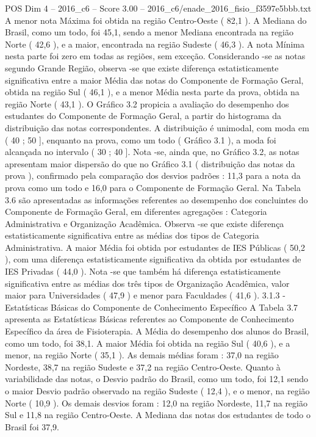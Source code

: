 \begin{textsample}{POS Dim 4 – 2016\_c6 – Score 3.00 – 2016\_c6/enade\_2016\_fisio\_f3597e5bbb.txt}
A menor nota Máxima foi obtida na região Centro-Oeste ( 82,1 ).
A Mediana do Brasil, como um todo, foi 45,1, sendo a menor Mediana encontrada na região Norte ( 42,6 ), e a maior, encontrada na região Sudeste ( 46,3 ).
A nota Mínima nesta parte foi zero em todas as regiões, sem exceção.
Considerando -se as notas segundo Grande Região, observa -se que existe diferença estatisticamente significativa entre a maior Média das notas do Componente de Formação Geral, obtida na região Sul ( 46,1 ), e a menor Média nesta parte da prova, obtida na região Norte ( 43,1 ).
O Gráfico 3.2 propicia a avaliação do desempenho dos estudantes do Componente de Formação Geral, a partir do histograma da distribuição das notas correspondentes.
A distribuição é unimodal, com moda em ( 40 ; 50 ], enquanto na prova, como um todo ( Gráfico 3.1 ), a moda foi alcançada no intervalo ( 30 ; 40 ].
Nota -se, ainda que, no Gráfico 3.2, as notas apresentam maior dispersão do que no Gráfico 3.1 ( distribuição das notas da prova ), confirmado pela comparação dos desvios padrões : 11,3 para a nota da prova como um todo e 16,0 para o Componente de Formação Geral.
Na Tabela 3.6 são apresentadas as informações referentes ao desempenho dos concluintes do Componente de Formação Geral, em diferentes agregações : Categoria Administrativa e Organização Acadêmica.
Observa -se que existe diferença estatisticamente significativa entre as médias dos tipos de Categoria Administrativa.
A maior Média foi obtida por estudantes de IES Públicas ( 50,2 ), com uma diferença estatisticamente significativa da obtida por estudantes de IES Privadas ( 44,0 ).
Nota -se que também há diferença estatisticamente significativa entre as médias dos três tipos de Organização Acadêmica, valor maior para Universidades ( 47,9 ) e menor para Faculdades ( 41,6 ). 3.1.3 - Estatísticas Básicas do Componente de Conhecimento Específico A Tabela 3.7 apresenta as Estatísticas Básicas referentes ao Componente de Conhecimento Específico da área de Fisioterapia.
A Média do desempenho dos alunos do Brasil, como um todo, foi 38,1.
A maior Média foi obtida na região Sul ( 40,6 ), e a menor, na região Norte ( 35,1 ).
As demais médias foram : 37,0 na região Nordeste, 38,7 na região Sudeste e 37,2 na região Centro-Oeste.
Quanto à variabilidade das notas, o Desvio padrão do Brasil, como um todo, foi 12,1 sendo o maior Desvio padrão observado na região Sudeste ( 12,4 ), e o menor, na região Norte ( 10,9 ).
Os demais desvios foram : 12,0 na região Nordeste, 11,7 na região Sul e 11,8 na região Centro-Oeste.
A Mediana das notas dos estudantes de todo o Brasil foi 37,9.

\end{textsample}
